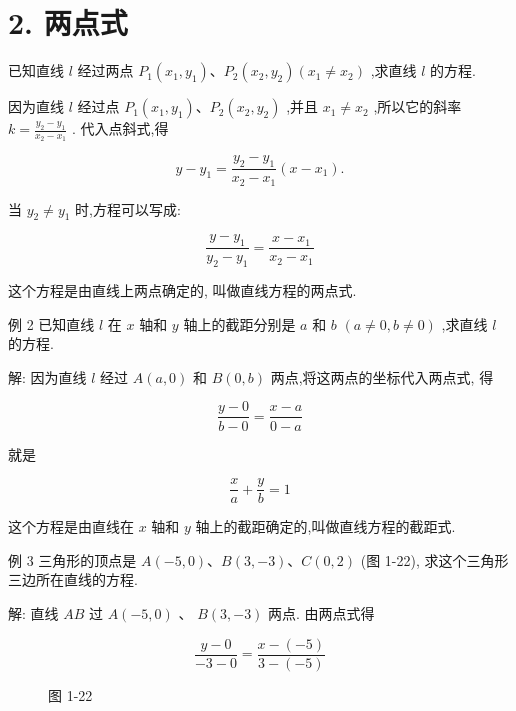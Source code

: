 \documentclass[lang=cn,newtx,10.5pt,scheme=chinese]{elegantbook}
\begin{document}
\section*{2. 两点式}

已知直线 \(l\) 经过两点 \({P}_{1}\left( {{x}_{1},{y}_{1}}\right) \text{、}{P}_{2}\left( {{x}_{2},{y}_{2}}\right) \left( {{x}_{1} \neq {x}_{2}}\right)\) ,求直线 \(l\) 的方程.

因为直线 \(l\) 经过点 \({P}_{1}\left( {{x}_{1},{y}_{1}}\right) \text{、}{P}_{2}\left( {{x}_{2},{y}_{2}}\right)\) ,并且 \({x}_{1} \neq {x}_{2}\) ,所以它的斜率 \(k = \frac{{y}_{2} - {y}_{1}}{{x}_{2} - {x}_{1}}\) . 代入点斜式,得

\[
  y - {y}_{1} = \frac{{y}_{2} - {y}_{1}}{{x}_{2} - {x}_{1}}\left( {x - {x}_{1}}\right) .
\]
\begin{corollary}[两点式]
当 \({y}_{2} \neq {y}_{1}\) 时,方程可以写成:

\[
  \frac{y - {y}_{1}}{{y}_{2} - {y}_{1}} = \frac{x - {x}_{1}}{{x}_{2} - {x}_{1}}
\]

这个方程是由直线上两点确定的, 叫做直线方程的两点式.
\end{corollary}
例 2 已知直线 \(l\) 在 \(x\) 轴和 \(y\) 轴上的截距分别是 \(a\) 和 \(b\) \(\left( {a \neq 0,b \neq 0}\right)\) ,求直线 \(l\) 的方程.

解: 因为直线 \(l\) 经过 \(A\left( {a,0}\right)\) 和 \(B\left( {0,b}\right)\) 两点,将这两点的坐标代入两点式, 得

\[
  \frac{y - 0}{b - 0} = \frac{x - a}{0 - a}
\]

就是
\begin{corollary}[截距式]
\[
  \frac{x}{a} + \frac{y}{b} = 1
\]

这个方程是由直线在 \(x\) 轴和 \(y\) 轴上的截距确定的,叫做直线方程的截距式.
\end{corollary}
例 3 三角形的顶点是 \(A\left( {-5,0}\right) \text{、}B\left( {3, - 3}\right) \text{、}C\left( {0,2}\right)\) (图 1-22), 求这个三角形三边所在直线的方程.

解: 直线 \({AB}\) 过 \(A\left( {-5,0}\right)\) 、 \(B\left( {3, - 3}\right)\) 两点. 由两点式得

\[
  \frac{y - 0}{-3 - 0} = \frac{x - \left( {-5}\right) }{3 - \left( {-5}\right) }
\]

\begin{figure}[h]
  \centering
  
  \caption{图 1-22}
\end{figure}
\end{document}
